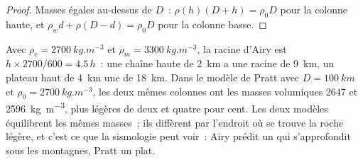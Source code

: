 \begin{proof}
Masses égales au-dessus de $D$~: $\rho(h)(D + h) = \rho_0 D$ pour la colonne haute, et
$\rho_w d + \rho(D - d) = \rho_0 D$ pour la colonne basse.
\end{proof}

Avec $\rho_c = \qty{2700}{kg.m^{-3}}$ et $\rho_m = \qty{3300}{kg.m^{-3}}$, la
racine d'Airy est $h\times2700/600 = 4.5\,h$~: une chaîne haute de \qty{2}{km} a une
racine de \qty{9}{km}, un plateau haut de \qty{4}{km} une de \qty{18}{km}. Dans le
modèle de Pratt avec $D = \qty{100}{km}$ et $\rho_0 = \qty{2700}{kg.m^{-3}}$, les
deux mêmes colonnes ont les masses volumiques 2647 et \qty{2596}{kg.m^{-3}}, plus
légères de deux et quatre pour cent. Les deux modèles équilibrent les mêmes masses~;
ils diffèrent par l'endroit où se trouve la roche légère, et c'est ce que la
sismologie peut voir~: Airy prédit un  qui s'approfondit sous les montagnes,
Pratt un  plat.

